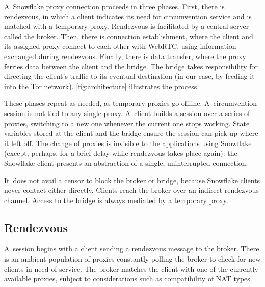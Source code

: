 \documentclass[letterpaper,twocolumn]{article}
\begin{document}
A~Snowflake proxy connection proceeds in three phases.
First, there is rendezvous, in which a client
indicates its need for circumvention service
and is matched with a temporary proxy.
Rendezvous is facilitated by a central server called the broker.
Then, there is connection establishment,
where the client and its assigned proxy connect to each other
with WebRTC, using information exchanged during rendezvous.
Finally, there is data transfer,
where the proxy ferries data
between the client and the bridge.
The bridge takes responsibility for directing the client's traffic
to its eventual destination
(in our case, by feeding it into the Tor network).
\autoref{fig:architecture} illustrates the process.

These phases repeat as needed, as temporary proxies go offline.
A~circumvention session is not tied to any single proxy.
A~client builds a session over
a series of proxies, switching to a new one
whenever the current one stops working.
State variables stored at the client and the bridge
ensure the session can pick up where it left off.
The change of proxies is invisible to the applications using Snowflake
(except, perhaps, for a brief delay while rendezvous takes place again):
the Snowflake client presents an abstraction of a single, uninterrupted connection.

It~does not avail a censor to block the broker or bridge,
because Snowflake clients never contact either directly.
Clients reach the broker over an indirect rendezvous channel.
Access to the bridge is always mediated by a temporary proxy.

\subsection{Rendezvous}
\label{sec:rendezvous}

A~session begins with a client sending a rendezvous message to the broker.
There is an ambient population of proxies
constantly polling the broker to check for new clients in need of service.
The broker matches the client with one of the currently available proxies,
subject to considerations such as compatibility of NAT types.
\end{document}
